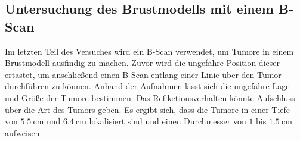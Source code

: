 \subsection{Untersuchung des Brustmodells mit einem B-Scan}
\label{subsec:Brustmodell}
Im letzten Teil des Versuches wird ein B-Scan verwendet, um Tumore in einem Brustmodell ausfindig zu machen. Zuvor wird die ungefähre Position dieser
ertastet, um anschließend einen B-Scan entlang einer Linie über den Tumor durchführen zu können. 
Anhand der Aufnahmen lässt sich die ungefähre Lage und Größe der Tumore bestimmen. Das Reflketionsverhalten könnte Aufschluss über die Art des Tumors geben.
Es ergibt sich, dass die Tumore in einer Tiefe von $\qty{5.5}{\centi\metre}$ und $\qty{6.4}{\centi\metre}$ lokalisiert sind und 
einen Durchmesser von $1$ bis $\qty{1.5}{\centi\metre}$ aufweisen.

